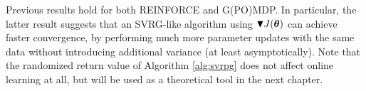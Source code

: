 Previous results hold for both REINFORCE and G(PO)MDP.
In particular, the latter result suggests that an \acs{SVRG}-like algorithm using $\blacktriangledown J(\boldsymbol{\theta})$ can achieve faster convergence, by performing much more parameter updates with the same data without introducing additional variance (at least asymptotically).
Note that the randomized return value of Algorithm \ref{alg:svrpg} does not affect online learning at all, but will be used as a theoretical tool in the next chapter.

\vspace{-0.05in}
